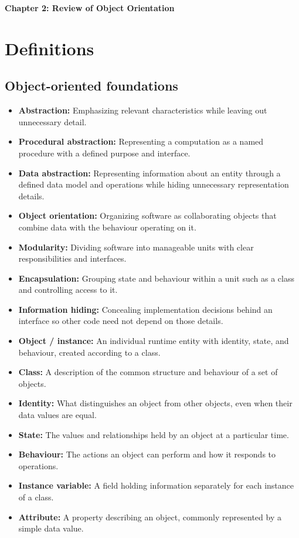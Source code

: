 \documentclass[11pt]{article}
\newcommand{\Title}[1]{%
  \begin{center}
    \fontsize{16}{28}\selectfont\textbf{#1}
  \end{center}
}
\newenvironment{DottedList}{%
  \begin{itemize}[leftmargin=2em, itemsep=0.35em, topsep=0.35em, label=\textbullet]
}{%
  \end{itemize}
}
\begin{document}
\Title{Chapter 2: Review of Object Orientation}
\section*{Definitions}
\subsection*{Object-oriented foundations}
\begin{DottedList}
  \item \textbf{Abstraction:} Emphasizing relevant characteristics while leaving out unnecessary detail.
  \item \textbf{Procedural abstraction:} Representing a computation as a named procedure with a defined purpose and interface.
  \item \textbf{Data abstraction:} Representing information about an entity through a defined data model and operations while hiding unnecessary representation details.
  \item \textbf{Object orientation:} Organizing software as collaborating objects that combine data with the behaviour operating on it.
  \item \textbf{Modularity:} Dividing software into manageable units with clear responsibilities and interfaces.
  \item \textbf{Encapsulation:} Grouping state and behaviour within a unit such as a class and controlling access to it.
  \item \textbf{Information hiding:} Concealing implementation decisions behind an interface so other code need not depend on those details.
  \item \textbf{Object / instance:} An individual runtime entity with identity, state, and behaviour, created according to a class.
  \item \textbf{Class:} A description of the common structure and behaviour of a set of objects.
  \item \textbf{Identity:} What distinguishes an object from other objects, even when their data values are equal.
  \item \textbf{State:} The values and relationships held by an object at a particular time.
  \item \textbf{Behaviour:} The actions an object can perform and how it responds to operations.
  \item \textbf{Instance variable:} A field holding information separately for each instance of a class.
  \item \textbf{Attribute:} A property describing an object, commonly represented by a simple data value.

\end{DottedList}
\end{document}
